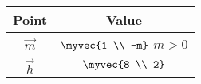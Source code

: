 \begin{tabular}[12pt]{ |c| c|}
    \hline
    \textbf{Point} & \textbf{Value}\\ 
    \hline
    $\vec{m}$ & $\myvec{1 \\ -m}$ \quad $m>0$\\
    \hline
    $\vec{h}$ & $\myvec{8 \\ 2}$\\
    \hline
\end{tabular}